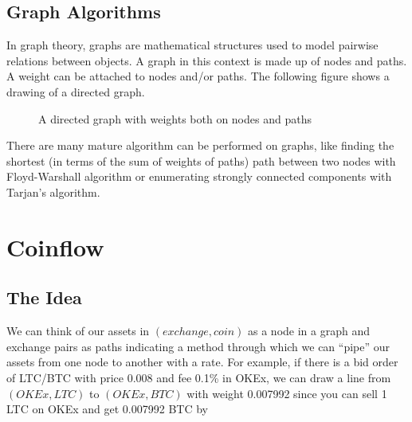 \documentclass{manuscript}
\begin{document}
    \subsection{Graph Algorithms}

    In graph theory, graphs are mathematical structures used to model pairwise relations between objects. A graph in this
    context is made up of nodes and paths. A weight can be attached to nodes and/or paths. The following figure shows a
    drawing of a directed graph.

    \begin{figure}[h]
        \centering
        \caption{A directed graph with weights both on nodes and paths}\label{Fig:1}
    \end{figure}

    There are many mature algorithm can be performed on graphs, like finding the shortest (in terms of the sum of weights
    of paths) path between two nodes with Floyd-Warshall algorithm or enumerating strongly connected components with
    Tarjan's algorithm.

    \section{Coinflow}

    \subsection{The Idea}

    We can think of our assets in $(exchange, coin)$ as a node in a graph and exchange pairs as paths indicating a method
    through which we can ``pipe'' our assets from one node to another with a rate. For example, if there is a bid order
    of LTC/BTC with price 0.008 and fee 0.1\% in OKEx, we can draw a line from $(OKEx, LTC)$ to $(OKEx, BTC)$ with weight
    0.007992 since you can sell 1 LTC on OKEx and get 0.007992 BTC by
\end{document}
